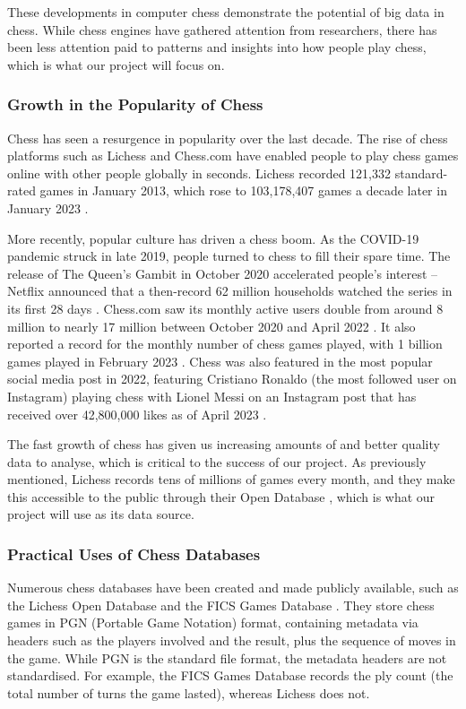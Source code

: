 \documentclass[a4paper, 11pt]{article}
\begin{document}
These developments in computer chess demonstrate the potential of big data in chess. While chess engines have gathered attention from researchers, there has been less attention paid to patterns and insights into how people play chess, which is what our project will focus on.

\subsubsection{Growth in the Popularity of Chess}
Chess has seen a resurgence in popularity over the last decade. The rise of chess platforms such as Lichess and Chess.com have enabled people to play chess games online with other people globally in seconds. Lichess recorded 121,332 standard-rated games in January 2013, which rose to 103,178,407 games a decade later in January 2023 \cite{lichessOpenDatabase}. 

More recently, popular culture has driven a chess boom. As the COVID-19 pandemic struck in late 2019, people turned to chess to fill their spare time. The release of The Queen's Gambit in October 2020 accelerated people's interest -- Netflix announced that a then-record 62 million households watched the series in its first 28 days \cite{chessIsBooming}. Chess.com saw its monthly active users double from around 8 million to nearly 17 million between October 2020 and April 2022 \cite{chessIsBooming}. It also reported a record for the monthly number of chess games played, with 1 billion games played in February 2023 \cite{chessCom1BillionGamesInFebruary}. Chess was also featured in the most popular social media post in 2022, featuring Cristiano Ronaldo (the most followed user on Instagram) playing chess with Lionel Messi on an Instagram post that has received over 42,800,000 likes as of April 2023 \cite{ronaldoMessiChess}.

The fast growth of chess has given us increasing amounts of and better quality data to analyse, which is critical to the success of our project. As previously mentioned, Lichess records tens of millions of games every month, and they make this accessible to the public through their Open Database \cite{lichessOpenDatabase}, which is what our project will use as its data source.

\subsubsection{Practical Uses of Chess Databases}
Numerous chess databases have been created and made publicly available, such as the Lichess Open Database \cite{lichessOpenDatabase} and the FICS Games Database \cite{ficsGamesDatabase}. They store chess games in PGN (Portable Game Notation) format, containing metadata via headers such as the players involved and the result, plus the sequence of moves in the game. While PGN is the standard file format, the metadata headers are not standardised. For example, the FICS Games Database records the ply count (the total number of turns the game lasted), whereas Lichess does not.
\end{document}
